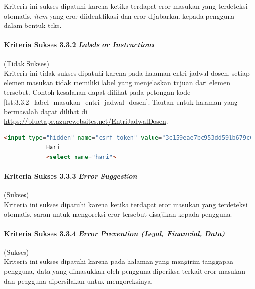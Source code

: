 \documentclass[a4paper,twoside]{article}
\begin{document}
\begin{enumerate}
		Kriteria ini sukses dipatuhi karena ketika terdapat eror masukan yang terdeteksi otomatis, \textit{item} yang eror diidentifikasi dan eror dijabarkan kepada pengguna dalam bentuk teks.

		\paragraph{Kriteria Sukses 3.3.2 \textit{Labels or Instructions}}
		\label{par:kepatuhan_bluetape_kriteria_sukses_3.3.2}
		(Tidak Sukses)\\

		Kriteria ini tidak sukses dipatuhi karena pada halaman entri jadwal dosen, setiap elemen masukan tidak memiliki label yang menjelaskan tujuan dari elemen tersebut. Contoh kesalahan dapat dilihat pada potongan kode \ref{lst:3.3.2_label_masukan_entri_jadwal_dosen}. Tautan untuk halaman yang bermasalah dapat dilihat di \url{https://bluetape.azurewebsites.net/EntriJadwalDosen}.

		\begin{lstlisting}[frame=single, label={lst:3.3.2_label_masukan_entri_jadwal_dosen}, language=HTML, caption=Kriteria Sukses 3.3.2 - Tidak Terdapat Label pada Kolom Masukan di Halaman Entri Jadwal Dosen]
			<input type="hidden" name="csrf_token" value="3c159eae7bc953dd591b679c080ed066"/>
			Hari
			<select name="hari">
		\end{lstlisting}

		\paragraph{Kriteria Sukses 3.3.3 \textit{Error Suggestion}}
		\label{par:kepatuhan_bluetape_kriteria_sukses_3.3.3}
		(Sukses)\\

		Kriteria ini sukses dipatuhi karena ketika terdapat eror masukan yang terdeteksi otomatis, saran untuk mengoreksi eror tersebut disajikan kepada pengguna.

		\paragraph{Kriteria Sukses 3.3.4 \textit{Error Prevention (Legal, Financial, Data)\\}}
		\label{par:kepatuhan_bluetape_kriteria_sukses_3.3.4}
		(Sukses)\\

		Kriteria ini sukses dipatuhi karena pada halaman yang mengirim tanggapan pengguna, data yang dimasukkan oleh pengguna diperiksa terkait eror masukan dan pengguna dipersilakan untuk mengoreksinya.


\end{enumerate}
\end{document}
